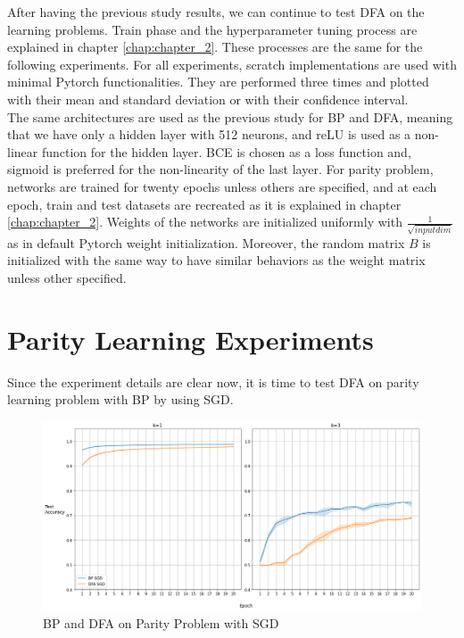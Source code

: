\documentclass[a4paper, nobind]{templates/ociamthesis}
\begin{document}
\noindent After having the previous study results, we can continue to test DFA on the learning problems. Train phase and the hyperparameter tuning process are explained in chapter \ref{chap:chapter_2}. These processes are the same for the following experiments. For all experiments, scratch implementations are used with minimal Pytorch functionalities. They are performed three times and plotted with their mean and standard deviation or with their confidence interval.\\
The same architectures are used as the previous study for BP and DFA, meaning that we have only a hidden layer with 512 neurons, and reLU is used as a non-linear function for the hidden layer. BCE is chosen as a loss function and, sigmoid is preferred for the non-linearity of the last layer. For parity problem, networks are trained for twenty epochs unless others are specified, and at each epoch, train and test datasets are recreated as it is explained in chapter \ref{chap:chapter_2}. Weights of the networks are initialized uniformly with \(\frac{1}{\sqrt{input dim}}\) as in default Pytorch weight initialization. Moreover, the random matrix \(B\) is initialized with the same way to have similar behaviors as the weight matrix unless other specified.

\hypertarget{parity-learning-experiments}{%
\section{Parity Learning Experiments}\label{parity-learning-experiments}}

Since the experiment details are clear now, it is time to test DFA on parity learning problem with BP by using SGD.

\begin{figure}

{\centering \includegraphics[width=1\linewidth]{figures/3_k13_SGD_DFAvsBP} 

}

\caption{BP and DFA on Parity Problem with SGD}\label{fig:BPvsDFA}
\end{figure}
\end{document}
